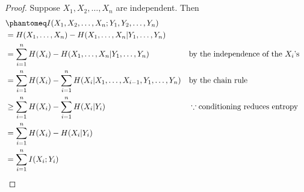 \documentclass[
  coursecode={MTHE 474},
  assignmentname={Homework \homeworknumber},
  studentnumber=20053722,
  name={Bryan Hoang}
]{
  ltxanswer%
}
\begin{document}
  \begin{questions}
    \setcounter{question}{\questionnumber}
    \addtocounter{question}{-1}
    \question{}
    \begin{solution}
      \begin{parts}
        \part{}
        \begin{subparts}
          \subpart{}
          \begin{proof}
            Suppose \(X_{1},X_{2},\dotsc,X_{n}\) are independent. Then
            \begin{align*}
               &\phantomeq I(X_{1},X_{2},\dotsc,X_{n};Y_{1},Y_{2},\dotsc,Y_{n})                                                                              \\
               &= H(X_{1},\dotsc,X_{n}) - H(X_{1},\dotsc,X_{n}|Y_{1},\dotsc,Y_{n})                                                                           \\
               &= \sum_{i=1}^n H(X_{i}) - H(X_{1},\dotsc,X_{n}|Y_{1},\dotsc,Y_{n})                      & &\text{by the independence of the } X_{i}\text{'s} \\
               &= \sum_{i=1}^n H(X_{i}) - \sum_{i=1}^n H(X_{i}|X_{1},\dotsc,X_{i-1},Y_{1},\dotsc,Y_{n}) & &\text{by the chain rule}                          \\
               &\ge \sum_{i=1}^n H(X_{i}) - \sum_{i=1}^n H(X_{i}|Y_{i})                                 & &\because \text{conditioning reduces entropy}      \\
               &= \sum_{i=1}^n H(X_{i}) - H(X_{i}|Y_{i})                                                                                                     \\
               &= \sum_{i=1}^n I(X_{i};Y_{i})
            \end{align*}
          \end{proof}


\end{subparts}
\end{parts}
\end{solution}
\end{questions}
\end{document}
